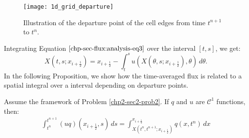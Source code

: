 \begin{figure}[!htb]
	\centering
	\texttt{[image: 1d\_grid\_departure]}
	\caption{Illustration of the departure point of the cell edges from time $t^{n+1}$ to $t^n$.\label{chp2-sec1-grid1d-dep}}
\end{figure}
Integrating Equation $\eqref{chp-sec-flux:analysis-eq3}$ over the interval
$[t,s]$, we get:
\begin{equation}
	\label{chp-sec-flux:analysis-eq4}
	X(t,s;x_{i+\frac{1}{2}}) = x_{i+\frac{1}{2}} - \int_{t}^{s}u(X(\theta,s;x_{i+\frac{1}{2}}),\theta) \,d\theta.
\end{equation}
In the following Proposition, we show how the time-averaged flux is 
related to a spatial integral over a interval depending on departure points.
\begin{prop}
	\label{chp2-sec-flux:prop1}
	Assume the framework of Problem \ref{chp2-sec2-prob2}.
	If $q$ and $u$ are $\mathcal{C}^1$ functions, then:
	\begin{align}
		\label{chp2-sec-flux:approx1}
		\int_{t^n}^{t^{n+1}} (uq)(x_{i+\frac{1}{2}},s) \,ds = 
		\int^{x_{i+\frac{1}{2}}}_{X(t^n,t^{n+1};x_{i+\frac{1}{2}})} q(x,t^n)\,dx
	\end{align}
\end{prop}
